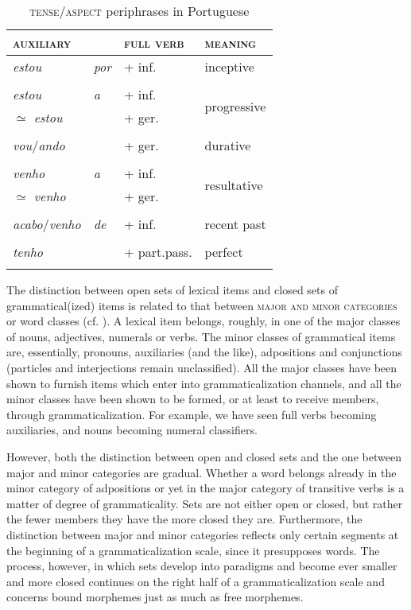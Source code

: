 \begin{table}
\begin{tabular}{llll}
\lsptoprule

\scshape auxiliary  & &  \scshape full verb & \scshape meaning\\
\midrule
\textit{estou} & \textit{por} & + inf. & inceptive\\
\\
\textit{estou} & \textit{a} &  + inf. & \multirow{2}{*}{progressive}\\
${\simeq}$ \textit{estou} & & + ger. \\
\\
\textit{vou}/\textit{ando}  & &  + ger. & durative\\
\\
\textit{venho} & \textit{a} & + inf. & \multirow{2}{*}{resultative}\\
${\simeq}$ \textit{venho}  & &  + ger. \\
\\
\textit{acabo}/\textit{venho} & \textit{de} & + inf. & recent past\\
\\
\textit{tenho}  & & + part.pass. & perfect\\
\lspbottomrule
\end{tabular}
\caption{\textsc{tense{\footnotesize /}aspect} periphrases in Portuguese}\label{T5} 
\end{table}

\noindent The distinction between open sets of lexical items and closed sets of grammatical(ized) items is related to that between \textsc{major and minor categories} or word classes (cf. \citealt[435f]{Lyons1968}). A lexical item belongs, roughly, in one of the major classes of nouns, adjectives, numerals or verbs. The minor classes of grammatical items are, essentially, pronouns, auxiliaries (and the like), adpositions and conjunctions (particles and interjections remain unclassified). All the major classes have been shown to furnish items which enter into grammaticalization channels, and all the minor classes have been shown to be formed, or at least to receive members, through grammaticalization. For example, we have seen full verbs becoming auxiliaries, and nouns becoming numeral classifiers.

However, both the distinction between open and closed sets and the one between major and minor categories are gradual. Whether a word belongs already in the minor category of adpositions or yet in the major category of transitive verbs is a matter of degree of grammaticality. Sets are not either open or closed, but rather the fewer members they have the more closed they are. Furthermore, the distinction between major and minor categories reflects only certain segments at the beginning of a grammaticalization scale, since it presupposes words. The process, however, in which sets develop into paradigms and become ever smaller and more closed continues on the right half of a grammaticalization scale and concerns bound morphemes just as much as free morphemes.


